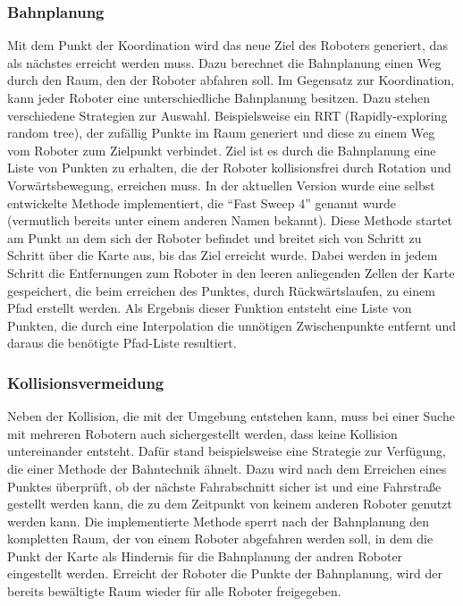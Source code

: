 \subsubsection{Bahnplanung}
Mit dem Punkt der Koordination wird das neue Ziel des Roboters generiert, das als nächstes erreicht werden muss. Dazu berechnet die Bahnplanung einen Weg durch den Raum, den der Roboter abfahren soll. Im Gegensatz zur Koordination, kann jeder Roboter eine unterschiedliche Bahnplanung besitzen. Dazu stehen verschiedene Strategien zur Auswahl. Beispielsweise ein RRT (Rapidly-exploring random tree), der zufällig Punkte im Raum generiert und diese zu einem Weg vom Roboter zum Zielpunkt verbindet. Ziel ist es durch die Bahnplanung eine Liste von Punkten zu erhalten, die der Roboter kollisionsfrei durch Rotation und Vorwärtsbewegung, erreichen muss. In der aktuellen Version wurde eine selbst entwickelte Methode implementiert, die "`Fast Sweep 4"' genannt wurde (vermutlich bereits unter einem anderen Namen bekannt). Diese Methode startet am Punkt an dem sich der Roboter befindet und breitet sich von Schritt zu Schritt über die Karte aus, bis das Ziel erreicht wurde. Dabei werden in jedem Schritt die Entfernungen zum Roboter in den leeren anliegenden Zellen der Karte gespeichert, die beim erreichen des Punktes, durch Rückwärtslaufen, zu einem Pfad erstellt werden. Als Ergebnis dieser Funktion entsteht eine Liste von Punkten, die durch eine Interpolation die unnötigen Zwischenpunkte entfernt und daraus die benötigte Pfad-Liste resultiert.\\
\subsubsection{Kollisionsvermeidung}
Neben der Kollision, die mit der Umgebung entstehen kann, muss bei einer Suche mit mehreren Robotern auch sichergestellt werden, dass keine Kollision untereinander entsteht. Dafür stand beispielsweise eine Strategie zur Verfügung, die einer Methode der Bahntechnik ähnelt. Dazu wird nach dem Erreichen eines Punktes überprüft, ob der nächste Fahrabschnitt sicher ist und eine Fahrstraße gestellt werden kann, die zu dem Zeitpunkt von keinem anderen Roboter genutzt werden kann. Die implementierte Methode sperrt nach der Bahnplanung den kompletten Raum, der von einem Roboter abgefahren werden soll, in dem die Punkt der Karte als Hindernis für die Bahnplanung der andren Roboter eingestellt werden. Erreicht der Roboter die Punkte der Bahnplanung, wird der bereits bewältigte Raum wieder für alle Roboter freigegeben.

